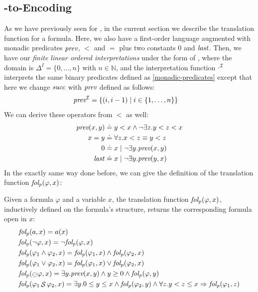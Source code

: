 \subsection{\PLTL-to-\FOL Encoding}\label{subsec:pltl-to-fol}
As we have previously seen for \LTLf, in the current section we describe the translation function for a \PLTL formula. Here, we also have a first-order language augmented with monadic predicates $\textit{prev}$, $<$ and $=$ plus two constants $0$ and $\mathit{last}$. Then, we have our \emph{finite linear ordered \FOL interpretations} under the form of \folInter, where the domain is $\Delta^{I} = \{0,\dots,n\}$ with $n \in \mathbb{N}$, and the interpretation function $\cdot^{\mathcal{I}}$ interprets the same binary predicates defined as \ref{monadic-predicates} except that here we change $\textit{succ}$ with $\textit{prev}$ defined as follows:
\begin{align}
\textit{prev}^{\mathcal{I}} &= \{ (i,i-1) \mid i \in \{1,\dots,n\}\}
\label{prev-predicate}
\end{align}
We can derive these operators from $<$ as well:
\begin{align*}
\textit{prev}(x,y) &\doteq y<x \wedge \lnot \exists z. y<z<x\\
x=y &\doteq \forall z. x<z \equiv y<z\\
0 &\doteq x \mid \lnot \exists y.\textit{prev}(x,y)\\
\mathit{last} &\doteq x \mid \lnot \exists y.\textit{prev}(y,x)
\end{align*}
In the exactly same way done before, we can give the definition of the translation function $\mathit{fol_p}(\varphi,x)$:
\begin{definition}\label{def:pltl-to-fol}
Given a \PLTL formula $\varphi$ and a variable $x$, the translation function $\mathit{fol_p}(\varphi,x)$, inductively defined on the \PLTL formula's structure, returns the corresponding \FOL formula open in $x$:
\begin{align*}
&\folp(a,x) = a(x)\\
&\folp(\lnot \varphi, x) = \lnot \folp(\varphi, x)\\
&\folp(\varphi_1 \lAND \varphi_2,x) = \folp(\varphi_1,x) \lAND \folp(\varphi_2,x)\\
&\folp(\varphi_1 \lOR \varphi_2,x) = \folp(\varphi_1,x) \lOR \folp(\varphi_2,x)\\
&\folp(\Yesterday \varphi, x) = \exists y.\pre(x,y) \lAND y \ge 0 \lAND \folp(\varphi, y)\\
&\folp(\varphi_1 \Since \varphi_2, x) = \exists y. 0 \le y \le x \lAND \folp(\varphi_2, y) \lAND \forall z.y < z \le x \Rightarrow \folp(\varphi_1,z)
\end{align*}
\end{definition}
